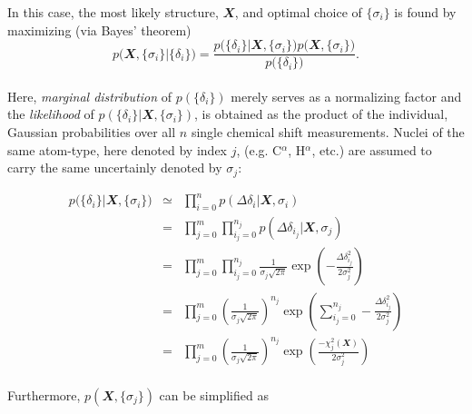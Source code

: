 In this case, the most likely structure, $\mathbfit X$, and optimal choice of $\{\sigma_i\}$ is found by maximizing (via Bayes' theorem)
\begin{equation}
p\Big(\mathbfit X, \{\sigma_i\} \Big| \{\delta_i\} \Big) = \frac{p\Big( \{\delta_i\} \Big| \mathbfit X, \{\sigma_i\}\Big)p\Big(\mathbfit X, \{\sigma_i\} \Big)}{p\Big( \{\delta_i\}\Big)}.
\end{equation}\\
Here, \textit{marginal distribution} of $p\left( \{\delta_i\}\right)$ merely serves as a normalizing factor and the \textit{likelihood} of $p\left( \{\delta_i\} | \mathbfit X, \{\sigma_i\}\right)$, is obtained as the product of the individual, Gaussian probabilities over all $n$ single chemical shift measurements. Nuclei of the same atom-type, here denoted by index $j$, (e.g. C$^\alpha$, H$^\alpha$, etc.) are assumed to carry the same uncertainly denoted by $\sigma_j$:

\begin{eqnarray}
p\Big( \{\delta_i\} \Big| \mathbfit X, \{\sigma_i\}\Big) &\simeq& \prod_{i=0}^{n} p\left( \Delta\delta_i | \mathbfit X, \sigma_i \right)\\
& = & \prod_{j=0}^{m} \prod_{i_j=0}^{n_j} p\left( \Delta\delta_{i_j} | \mathbfit X, \sigma_j \right)\\
& = & \prod_{j=0}^{m} \prod_{i_j=0}^{n_j} \frac{1}{\sigma_j \sqrt{2\pi}} \exp{ \left( - \frac{\Delta\delta_{i_j}^2}{2\sigma_j^2} \right) }\\
& = & \prod_{j=0}^{m} \left( \frac{1}{\sigma_j \sqrt{2\pi}}\right)^{n_j} \exp{ \left( \sum_{i_j=0}^{n_j} - \frac{\Delta\delta_{i_j}^2}{2\sigma_j^2} \right) }\\
& = & \prod_{j=0}^{m} \left( \frac{1}{\sigma_j \sqrt{2\pi}}\right)^{n_j} \exp{ \left(  \frac{- \chi_j^2(\mathbfit X)}{2\sigma_j^2}\right) }
\end{eqnarray}\\
Furthermore, $p\left(\mathbfit X, \{\sigma_j\} \right)$ can be simplified as 

